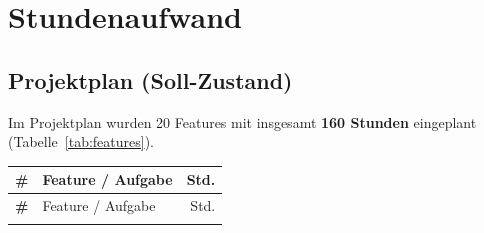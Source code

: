 \chapter{Stundenaufwand}

\section*{Projektplan (Soll-Zustand)}

Im Projektplan wurden 20 Features mit insgesamt \textbf{160 Stunden} eingeplant (Tabelle~\ref{tab:features}).

\begin{longtable}{>{\bfseries}p{0.5cm} p{13.5cm} r}
  \toprule
  \# & Feature / Aufgabe & Std. \\
  \midrule
  \endfirsthead
  \toprule
  \# & Feature / Aufgabe & Std. \\
  \midrule
  \endhead
  \bottomrule
  \endfoot
  \bottomrule
  \endlastfoot


\end{longtable}
